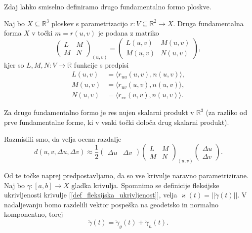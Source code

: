 Zdaj lahko smiselno definiramo drugo fundamentalno formo ploskve.

\begin{definicija}
\label{def_druga_fundamentalna_forma_ploskve}
 Naj bo $X \subseteq \mathbb{R}^3$ ploskev s parametrizacijo $r: V \subseteq \mathbb{R}^2 \to  X$. Druga fundamentalna forma $X$ v točki $m = r(u,v)$ je podana z matriko 
 \begin{equation*} \begin{pmatrix}
 L & M \\
 M & N
 \end{pmatrix}_{(u,v)} = \begin{pmatrix}
 L(u,v) & M(u,v) \\
 M(u,v) & N(u,v)
 \end{pmatrix}, \end{equation*}
 kjer so $L, M, N: V \to  \mathbb{R}$ funkcije s predpisi 
 \begin{align*}
    L(u,v)  &= \langle r_{uu}(u,v), n(u,v) \rangle,  \\
    M(u,v)  &= \langle r_{uv}(u,v), n(u,v) \rangle,  \\
    N(u,v)  &= \langle r_{vv}(u,v), n(u,v) \rangle. 
 \end{align*}

\end{definicija}

\begin{opomba}
    Za drugo fundamentalno formo je res nujen skalarni produkt v $\mathbb{R}^3$ (za razliko od prve fundamentalne forme, ki v vsaki točki določa drug skalarni produkt). 
\end{opomba}

Razmislili smo, da velja ocena razdalje
\begin{equation*} d(u, v, \Delta u, \Delta v) \approx \frac{1}{2} \begin{pmatrix}
  \Delta u  &  \Delta v 
\end{pmatrix} \begin{pmatrix}
  L & M \\
  M & N
\end{pmatrix}_{(u,v)}  
\begin{pmatrix}
  \Delta u \\
  \Delta v 
\end{pmatrix}.\end{equation*}

Od te točke naprej predpostavljamo, da so vse krivulje naravno parametrizirane. Naj bo $\gamma: [a,b] \to X$ gladka krivulja. 
Spomnimo se definicije fleksijske ukrivljenosti krivulje [\ref{def_fleksijska_ukrivljenost}], velja $\varkappa(t) = \lvert\lvert \ddot{\gamma}(t) \rvert\rvert$.
V nadaljevanju bomo razdelili vektor pospeška na geodetsko in normalno komponentno, torej 
\begin{equation*} \ddot{\gamma}(t) = \ddot{\gamma}_g(t) + \ddot{\gamma}_n(t).\end{equation*}

